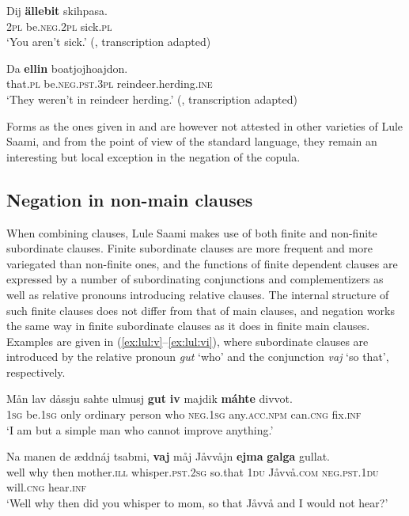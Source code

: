 \documentclass[output=paper,colorlinks,citecolor=brown]{langscibook}
\begin{document}
\ea\label{ex:lul:24} 
    \gll Dij \textbf{ällebit} skihpasa. \\ 
         \textsc{2pl} be.\textsc{neg.2pl} sick.\textsc{pl} \\
    \glt ‘You aren’t sick.’ (\citealt{KejonenFC}, transcription adapted)
\z 

\ea\label{ex:lul:25} 
    \gll Da \textbf{ellin} boatjojhoajdon. \\ 
         that\textsc{.pl} be.\textsc{neg.pst.3pl} reindeer.herding.\textsc{ine} \\
    \glt  ‘They weren’t in reindeer herding.’ (\citealt{KejonenFC}, transcription adapted)
\z 

Forms as the ones given in  and  are however not attested in other varieties of Lule Saami, and from the point of view of the standard language, they remain an interesting but local exception in the negation of the copula.

\subsection{Negation in non-main clauses} \label{sec:lul:2.4}

When combining clauses, Lule Saami makes use of both finite and non-finite subordinate clauses. Finite subordinate clauses are more frequent and more variegated than non-finite ones, and the functions of finite dependent clauses are expressed by a number of subordinating conjunctions and complementizers as well as relative pronouns introducing relative clauses. The internal structure of such finite clauses does not differ from that of main clauses, and negation works the same way in finite subordinate clauses as it does in finite main clauses.
Examples are given in (\ref{ex:lul:v}--\ref{ex:lul:vi}), where subordinate clauses are introduced by the relative pronoun \textit{gut} ‘who’ and the conjunction \textit{vaj} ‘so that’, respectively.

\ea\label{ex:lul:v}
\gll Mån lav dåssju sahte ulmusj \textbf{gut} \textbf{iv} majdik 
\textbf{máhte} divvot.\\
    \textsc{1sg} be.\textsc{1sg} only ordinary person who \textsc{neg.1sg} any.\textsc{acc.npm} can.\textsc{cng} fix.\textsc{inf} \\
\glt ‘I am but a simple man who cannot improve anything.’  \citep{SIKOR2021} \\
\z

\ea\label{ex:lul:vi}
    \gll Na manen de æddnáj tsabmi, \textbf{vaj} måj Jåvvåjn \textbf{ejma} \textbf{galga} gullat. \\
        well why then mother.\textsc{ill} whisper.\textsc{pst.2sg} so.that \textsc{1du} Jåvvå.\textsc{com} \textsc{neg.pst.1du} will.\textsc{cng} hear.\textsc{inf}\\
    \glt ‘Well why then did you whisper to mom, so that Jåvvå and I would not hear?’  \citep{SIKOR2021}\\
\z 
\end{document}
